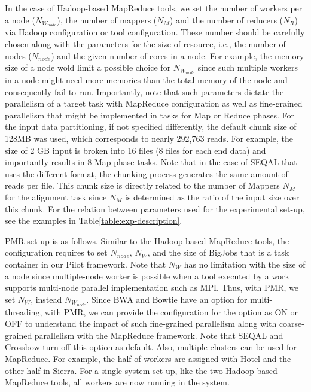 \documentclass{acm_proc_article-sp}
\begin{document}
In the case of Hadoop-based MapReduce tools, we set the number of workers per a node ($N_{W_{node}}$), the number of mappers ($N_M$) and the number of reducers ($N_R$) via Hadoop configuration or tool configuration.  These number should be carefully chosen along with the parameters for the size of resource, i.e., the number of nodes ($N_{node}$) and the given number of cores in a node.  For example, the memory size of a node wold limit a possible choice for $N_{W_{node}}$ since such multiple workers in a node might need more memories than the total memory of the node and consequently fail to run.  Importantly, note that such parameters dictate the parallelism of a target task with MapReduce configuration as well as fine-grained parallelism that might be implemented in tasks for Map or Reduce phases.  For the input data partitioning, if not specified differently, the default chunk size of 128MB was used, which corresponds to nearly 292,763 reads.  For example, the size of 2 GB input is broken into 16 files (8 files for each end data) and importantly results in 8 Map phase tasks.  Note that in the case of SEQAL that uses the different format, the chunking process generates the same amount of reads per file.  This chunk size is directly related to the number of Mappers $N_M$ for the alignment task since  $N_M$ is determined as the ratio of the input size over this chunk.   For the relation between parameters used for the experimental set-up, see the examples in Table\ref{table:exp-description}. 
%

PMR set-up is as follows.  Similar to the Hadoop-based MapReduce tools, the configuration requires to set $N_{node}$, $N_W$, and the size of BigJobs that is a task container in our Pilot framework\cite{pmr2012,saga_bigjob_condor_cloud,pstar11}.  Note that $N_W$ has no limitation with the size of a node since multiple-node worker is possible when a tool executed by a work supports multi-node parallel implementation such as MPI.  Thus, with PMR, we set $N_W$, instead $N_{W_{node}}$.  Since BWA and Bowtie have an option for multi-threading, with PMR, we can provide the configuration for the option as ON or OFF to understand the impact of such fine-grained parallelism along with coarse-grained parallelism with the MapReduce framework.  Note that SEQAL and Crossbow turn off this option as default.  Also, multiple clusters can be used for MapReduce. For example, the half of workers are assigned with Hotel and the other half in Sierra.  For a single system set up, like the two Hadoop-based MapReduce tools, all workers are now running in the system.  
\end{document}
